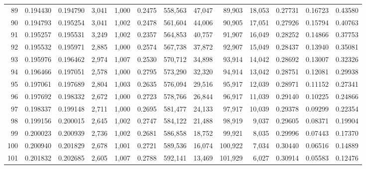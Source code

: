 \begin{tabular}{rrrrrrrrrrrrr}
89  &  0.194430 &  0.194790 &   3,041 &  1,000 &                                     0.2475 &  558,563 &   47,047 &   89,903 &   18,053 &  0.27731 &  0.16723 &  0.43580 \\
90  &  0.194793 &  0.195254 &   3,041 &  1,002 &                                     0.2478 &  561,604 &   44,006 &   90,905 &   17,051 &  0.27926 &  0.15794 &  0.40763 \\
91  &  0.195257 &  0.195531 &   3,249 &  1,002 &                                     0.2357 &  564,853 &   40,757 &   91,907 &   16,049 &  0.28252 &  0.14866 &  0.37753 \\
92  &  0.195532 &  0.195971 &   2,885 &  1,000 &                                     0.2574 &  567,738 &   37,872 &   92,907 &   15,049 &  0.28437 &  0.13940 &  0.35081 \\
93  &  0.195976 &  0.196462 &   2,974 &  1,007 &                                     0.2530 &  570,712 &   34,898 &   93,914 &   14,042 &  0.28692 &  0.13007 &  0.32326 \\
94  &  0.196466 &  0.197051 &   2,578 &  1,000 &                                     0.2795 &  573,290 &   32,320 &   94,914 &   13,042 &  0.28751 &  0.12081 &  0.29938 \\
95  &  0.197061 &  0.197689 &   2,804 &  1,003 &                                     0.2635 &  576,094 &   29,516 &   95,917 &   12,039 &  0.28971 &  0.11152 &  0.27341 \\
96  &  0.197692 &  0.198332 &   2,672 &  1,000 &                                     0.2723 &  578,766 &   26,844 &   96,917 &   11,039 &  0.29140 &  0.10225 &  0.24866 \\
97  &  0.198337 &  0.199148 &   2,711 &  1,000 &                                     0.2695 &  581,477 &   24,133 &   97,917 &   10,039 &  0.29378 &  0.09299 &  0.22354 \\
98  &  0.199156 &  0.200015 &   2,645 &  1,002 &                                     0.2747 &  584,122 &   21,488 &   98,919 &    9,037 &  0.29605 &  0.08371 &  0.19904 \\
99  &  0.200023 &  0.200939 &   2,736 &  1,002 &                                     0.2681 &  586,858 &   18,752 &   99,921 &    8,035 &  0.29996 &  0.07443 &  0.17370 \\
100 &  0.200940 &  0.201829 &   2,678 &  1,001 &                                     0.2721 &  589,536 &   16,074 &  100,922 &    7,034 &  0.30440 &  0.06516 &  0.14889 \\
101 &  0.201832 &  0.202685 &   2,605 &  1,007 &                                     0.2788 &  592,141 &   13,469 &  101,929 &    6,027 &  0.30914 &  0.05583 &  0.12476 \\

\end{tabular}
